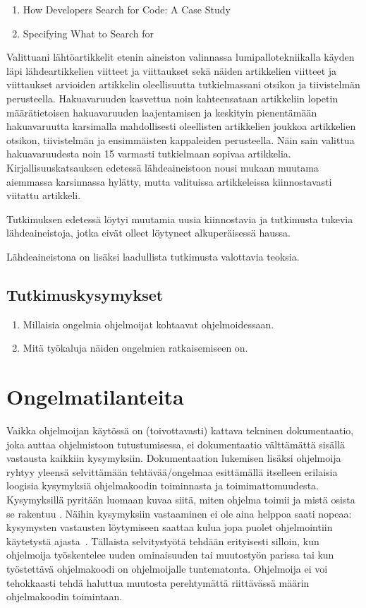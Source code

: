 \documentclass[finnish]{tktltiki2}
\theoremstyle{definition}
\theoremstyle{remark}
\begin{document}
\begin{enumerate}
  \item How Developers Search for Code: A Case Study~\cite{g_search_code}
  \item Specifying What to Search for~\cite{what-to-search-for}
\end{enumerate}
Valittuani lähtöartikkelit etenin aineiston valinnassa lumipallotekniikalla
käyden läpi lähdeartikkelien viitteet ja viittaukset sekä näiden artikkelien viitteet ja viittaukset arvioiden artikkelin oleellisuutta tutkielmassani otsikon ja tiivistelmän perusteella. Hakuavaruuden kasvettua noin kahteensataan artikkeliin lopetin määrätietoisen hakuavaruuden laajentamisen ja keskityin pienentämään hakuavaruutta karsimalla mahdollisesti oleellisten artikkelien joukkoa artikkelien otsikon, tiivistelmän ja ensimmäisten kappaleiden perusteella. Näin sain valittua hakuavaruudesta noin 15 varmasti tutkielmaan sopivaa artikkelia.  Kirjallisuuskatsauksen edetessä lähdeaineistoon nousi mukaan muutama aiemmassa karsinnassa hylätty, mutta valituissa artikkeleissa kiinnostavasti viitattu artikkeli.

Tutkimuksen edetessä löytyi muutamia uusia kiinnostavia ja tutkimusta tukevia lähdeaineistoja, jotka eivät olleet löytyneet alkuperäisessä haussa.

Lähdeaineistona on lisäksi laadullista tutkimusta valottavia teoksia.

\subsection{Tutkimuskysymykset}
\begin{enumerate}
\item Millaisia ongelmia ohjelmoijat kohtaavat ohjelmoidessaan.
\item Mitä työkaluja näiden ongelmien ratkaisemiseen on.
\end{enumerate}

\section{Ongelmatilanteita}

Vaikka ohjelmoijan käytössä on (toivottavasti) kattava tekninen dokumentaatio, joka auttaa ohjelmistoon tutustumisessa, ei dokumentaatio välttämättä sisällä vastausta kaikkiin kysymyksiin. Dokumentaation lukemisen lisäksi ohjelmoija ryhtyy yleensä selvittämään tehtävää/ongelmaa esittämällä itselleen erilaisia loogisia kysymyksiä ohjelmakoodin toiminnasta ja toimimattomuudesta. Kysymyksillä pyritään luomaan kuvaa siitä, miten ohjelma toimii ja mistä osista se rakentuu \cite{g_search_code, questions-during-software-evolution-tasks,asking-and-answering-api-questions}. Näihin kysymyksiin vastaaminen ei ole aina helppoa saati nopeaa: kysymysten vastausten löytymiseen saattaa kulua jopa puolet ohjelmointiin käytetystä ajasta~\cite{eliciting-design-requirements-for-maintenance-oriented-ides}.
Tällaista selvitystyötä tehdään erityisesti silloin, kun ohjelmoija työskentelee uuden ominaisuuden tai muutostyön parissa tai kun työstettävä ohjelmakoodi on ohjelmoijalle tuntematonta. Ohjelmoija ei voi tehokkaasti tehdä haluttua muutosta perehtymättä riittävässä määrin ohjelmakoodin toimintaan.
\end{document}
